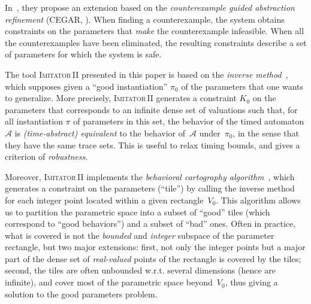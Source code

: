 \documentclass[a4paper,10pt]{article}
\newcommand{\A}{\mathcal{A}}
\newcommand{\imitatordeux}{\textsc{Imitator}\,II}
\begin{document}
In~\cite{fjk08}, they propose an extension based on the {\em counterexample guided abstraction refinement} (CEGAR, \cite{cgjlv00}).
When finding a counterexample, the system obtains constraints on the parameters that {\em make} the counterexample infeasible.
When all the counterexamples have been eliminated, the resulting constraints describe a set of parameters for which the system is safe.


The tool \imitatordeux{} presented in this paper is based on the {\em inverse method}~\cite{acef09}, which supposes given a ``good instantiation'' $\pi_0$ of the parameters that one wants to generalize.
More precisely,  \imitatordeux{} generates a constraint $K_0$ on the parameters that corresponds to an infinite dense set of valuations such that, for all instantiation $\pi$ of parameters in this set, the behavior of the timed automaton $\A$ is {\em (time-abstract) equivalent} to the behavior of~$\A$ under~$\pi_0$, in the sense that they have the same trace sets.
This is useful to relax timing bounds, and gives a criterion of \emph{robustness}.

Moreover, \imitatordeux{} implements the \emph{behavioral cartography algorithm}~\cite{af10}, which generates a constraint on the parameters (``tile'') by calling the inverse method for each integer point located within a given rectangle~$V_0$.
This algorithm allows us to partition the parametric space into a subset of ``good'' tiles (which correspond to ``good behaviors'') and a subset of ``bad'' ones.
Often in practice, what is covered is not the {\em bounded} and {\em integer} subspace of the parameter rectangle, but two major extensions:
first, not only the integer points but a major part of the dense set of {\em real-valued} points of the rectangle is covered by the tiles;
second, the tiles are often unbounded w.r.t. several dimensions (hence are infinite), and cover most of the parametric space beyond~$V_0$, thus giving a solution to the good parameters problem.
\end{document}
